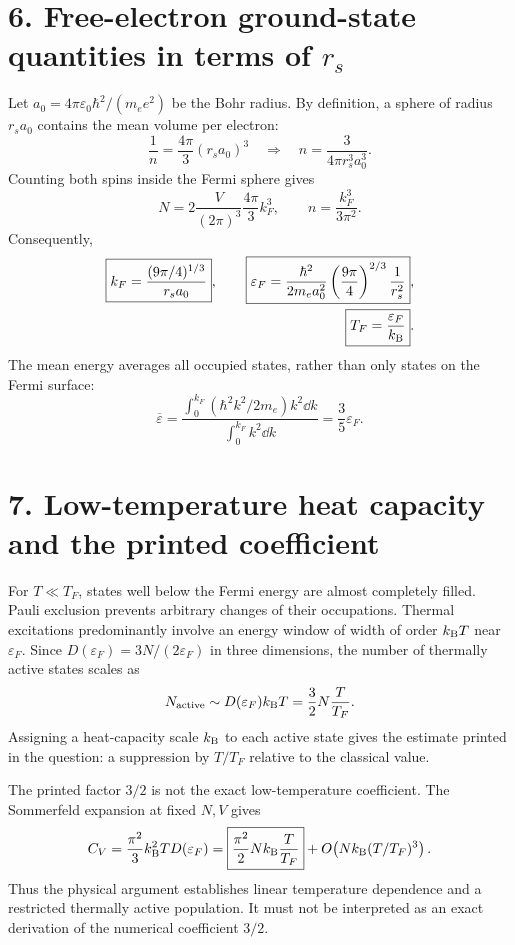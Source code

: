 \section*{6. Free-electron ground-state quantities in terms of $r_s$}
Let $a_0=4\pi\varepsilon_0\hbar^2/(m_e e^2)$ be the Bohr radius. By definition, a sphere of radius $r_sa_0$ contains the mean volume per electron:
\[
\frac1n=\frac{4\pi}{3}(r_sa_0)^3
\quad\Longrightarrow\quad
\boxed{n=\frac{3}{4\pi r_s^3a_0^3}}.
\]
Counting both spins inside the Fermi sphere gives
\[
N=2\frac V{(2\pi)^3}\frac{4\pi}{3}k_F^3,
\qquad n=\frac{k_F^3}{3\pi^2}.
\]
Consequently,
\begin{align*}
\boxed{k_F=\frac{(9\pi/4)^{1/3}}{r_sa_0}},\qquad
\boxed{\varepsilon_F=\frac{\hbar^2}{2m_ea_0^2}
\left(\frac{9\pi}{4}\right)^{2/3}\frac1{r_s^2}},\\
\boxed{T_F=\frac{\varepsilon_F}{k_{\mathrm B}}}.
\end{align*}
The mean energy averages all occupied states, rather than only states on the Fermi surface:
\[
\overline\varepsilon
=\frac{\int_0^{k_F}(\hbar^2k^2/2m_e)k^2\dd k}
{\int_0^{k_F}k^2\dd k}
=\boxed{\frac35\varepsilon_F}.
\]

\section*{7. Low-temperature heat capacity and the printed coefficient}
For $T\ll T_F$, states well below the Fermi energy are almost completely filled. Pauli exclusion prevents arbitrary changes of their occupations. Thermal excitations predominantly involve an energy window of width of order $k_{\mathrm B} T$ near $\varepsilon_F$.
Since $D(\varepsilon_F)=3N/(2\varepsilon_F)$ in three dimensions, the number of thermally active states scales as
\[
N_{\rm active}\sim D(\varepsilon_F)k_{\mathrm B} T
=\frac32N\frac{T}{T_F}.
\]
Assigning a heat-capacity scale $k_{\mathrm B}$ to each active state gives the estimate printed in the question: a suppression by $T/T_F$ relative to the classical value.

The printed factor $3/2$ is not the exact low-temperature coefficient. The Sommerfeld expansion at fixed $N,V$ gives
\[
C_V=\frac{\pi^2}{3}k_{\mathrm B}^2T D(\varepsilon_F)
=\boxed{\frac{\pi^2}{2}Nk_{\mathrm B}\frac{T}{T_F}}
+O\!\left(Nk_{\mathrm B}(T/T_F)^3\right).
\]
Thus the physical argument establishes linear temperature dependence and a restricted thermally active population. It must not be interpreted as an exact derivation of the numerical coefficient $3/2$.

